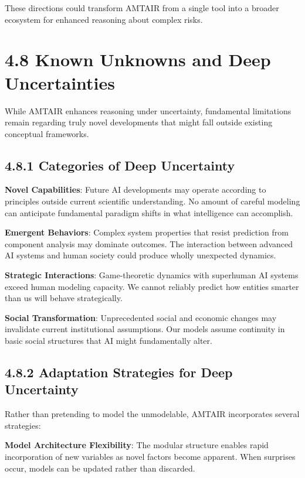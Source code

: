 \documentclass[
  11pt,
  letterpaper,
  openany]{book}
\begin{document}
These directions could transform AMTAIR from a single tool into a
broader ecosystem for enhanced reasoning about complex risks.

\section{4.8 Known Unknowns and Deep
Uncertainties}\label{sec-deep-uncertainties}

While AMTAIR enhances reasoning under uncertainty, fundamental
limitations remain regarding truly novel developments that might fall
outside existing conceptual frameworks.

\subsection{4.8.1 Categories of Deep
Uncertainty}\label{sec-uncertainty-categories}

\textbf{Novel Capabilities}: Future AI developments may operate
according to principles outside current scientific understanding. No
amount of careful modeling can anticipate fundamental paradigm shifts in
what intelligence can accomplish.

\textbf{Emergent Behaviors}: Complex system properties that resist
prediction from component analysis may dominate outcomes. The
interaction between advanced AI systems and human society could produce
wholly unexpected dynamics.

\textbf{Strategic Interactions}: Game-theoretic dynamics with superhuman
AI systems exceed human modeling capacity. We cannot reliably predict
how entities smarter than us will behave strategically.

\textbf{Social Transformation}: Unprecedented social and economic
changes may invalidate current institutional assumptions. Our models
assume continuity in basic social structures that AI might fundamentally
alter.

\subsection{4.8.2 Adaptation Strategies for Deep
Uncertainty}\label{sec-adaptation-strategies}

Rather than pretending to model the unmodelable, AMTAIR incorporates
several strategies:

\textbf{Model Architecture Flexibility}: The modular structure enables
rapid incorporation of new variables as novel factors become apparent.
When surprises occur, models can be updated rather than discarded.
\end{document}
